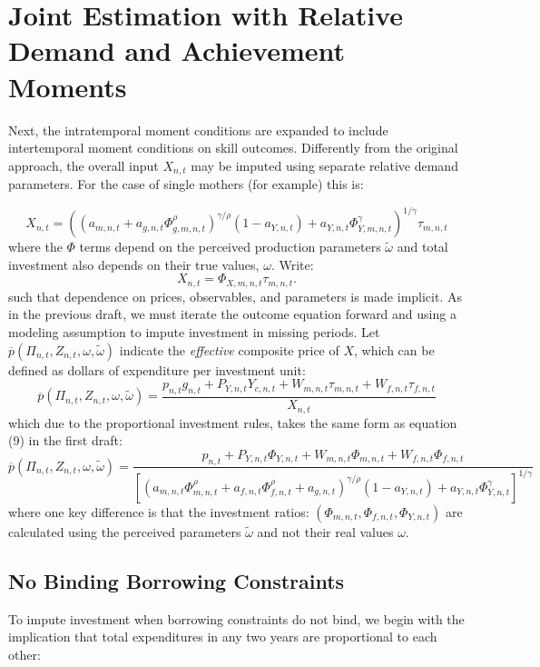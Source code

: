 \documentclass{article}
\begin{document}
\section*{Joint Estimation with Relative Demand and Achievement Moments}

Next, the intratemporal moment conditions are expanded to include intertemporal moment conditions on skill outcomes. Differently from the original approach, the overall input $X_{n,t}$ may be imputed using separate relative demand parameters. For the case of single mothers (for example) this is:

\[ X_{n,t} = \left(\left(a_{m,n,t} + a_{g,n,t}\Phi_{g,m,n,t}^\rho\right)^{\gamma/
\rho}(1-a_{Y,n,t}) + a_{Y,n,t}\Phi_{Y,m,n,t}^\gamma\right)^{1/\gamma}\tau_{m,n,t}
 \]
where the $\Phi$ terms depend on the perceived production parameters $\tilde{\omega}$ and total investment also depends on their true values, $\omega$. Write:
\[ X_{n,t} = \Phi_{X,m,n,t}\tau_{m,n,t}.\]
such that dependence on prices, observables, and parameters is made implicit.
As in the previous draft, we must iterate the outcome equation forward and using a modeling assumption to impute investment in missing periods. Let $\overline{p}(\Pi_{n,t},Z_{n,t},\omega,\tilde{\omega})$ indicate the \emph{effective} composite price of $X$, which can be defined as dollars of expenditure per investment unit:
\[ \overline{p}(\Pi_{n,t},Z_{n,t},\omega,\tilde{\omega}) = \frac{p_{n,t}g_{n,t}+P_{Y,n,t}Y_{c,n,t}+W_{m,n,t}\tau_{m,n,t}+W_{f,n,t}\tau_{f,n,t}}{X_{n,t}} \]
which due to the proportional investment rules, takes the same form as equation (9) in the first draft:
\[ \overline{p}(\Pi_{n,t},Z_{n,t},\omega,\tilde{\omega}) = \frac{p_{n,t}+P_{Y,n,t}\Phi_{Y,n,t}+W_{m,n,t}\Phi_{m,n,t}+W_{f,n,t}\Phi_{f,n,t}}{\left[\left(a_{m,n,t}\Phi_{m,n,t}^\rho+a_{f,n,t}\Phi_{f,n,t}^\rho+a_{g,n,t}\right)^{\gamma / \rho}(1-a_{Y,n,t}) + a_{Y,n,t}\Phi_{Y,n,t}^{\gamma}\right]^{1/\gamma}} \]
where one key difference is that the investment ratios: $(\Phi_{m,n,t},\Phi_{f,n,t},\Phi_{Y,n,t})$ are calculated using the perceived parameters $\tilde{\omega}$ and not their real values $\omega$.

\subsection*{No Binding Borrowing Constraints}

To impute investment when borrowing constraints do not bind, we begin with the implication that total expenditures in any two years are proportional to each other:
\end{document}
